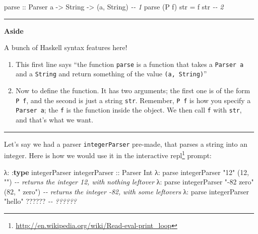 \documentclass[]{article}
\newenvironment{Shaded}{}{}
\newcommand{\CommentTok}[1]{\textcolor[rgb]{0.38,0.63,0.69}{\textit{#1}}}
\newcommand{\DataTypeTok}[1]{\textcolor[rgb]{0.56,0.13,0.00}{#1}}
\newcommand{\DecValTok}[1]{\textcolor[rgb]{0.25,0.63,0.44}{#1}}
\newcommand{\KeywordTok}[1]{\textcolor[rgb]{0.00,0.44,0.13}{\textbf{#1}}}
\newcommand{\NormalTok}[1]{#1}
\newcommand{\OperatorTok}[1]{\textcolor[rgb]{0.40,0.40,0.40}{#1}}
\newcommand{\OtherTok}[1]{\textcolor[rgb]{0.00,0.44,0.13}{#1}}
\newcommand{\StringTok}[1]{\textcolor[rgb]{0.25,0.44,0.63}{#1}}
\renewcommand{\href}[2]{#2\footnote{\url{#1}}}
\begin{document}
\begin{Shaded}
\begin{Highlighting}[]
\OtherTok{parse ::} \DataTypeTok{Parser}\NormalTok{ a }\OtherTok{{-}\textgreater{}} \DataTypeTok{String} \OtherTok{{-}\textgreater{}}\NormalTok{ (a, }\DataTypeTok{String}\NormalTok{)              }\CommentTok{{-}{-} 1}
\NormalTok{parse (}\DataTypeTok{P}\NormalTok{ f) str }\OtherTok{=}\NormalTok{ f str                                 }\CommentTok{{-}{-} 2}
\end{Highlighting}
\end{Shaded}

\begin{center}\rule{0.5\linewidth}{0.5pt}\end{center}

\textbf{Aside}

A bunch of Haskell syntax features here!

\begin{enumerate}
\def\labelenumi{\arabic{enumi}.}
\item
  This first line says ``the function \texttt{parse} is a function that takes a
  \texttt{Parser\ a} and a \texttt{String} and return something of the value
  \texttt{(a,\ String)}''
\item
  Now to define the function. It has two arguments; the first one is of the form
  \texttt{P\ f}, and the second is just a string \texttt{str}. Remember,
  \texttt{P\ f} is how you specify a \texttt{Parser\ a}; the \texttt{f} is the
  function inside the object. We then call \texttt{f} with \texttt{str}, and
  that's what we want.
\end{enumerate}

\begin{center}\rule{0.5\linewidth}{0.5pt}\end{center}

Let's say we had a parser \texttt{integerParser} pre-made, that parses a string
into an integer. Here is how we would use it in the interactive
\href{http://en.wikipedia.org/wiki/Read-eval-print_loop}{repl} prompt:

\begin{Shaded}
\begin{Highlighting}[]
\NormalTok{λ}\OperatorTok{:} \OperatorTok{:}\KeywordTok{type}\NormalTok{ integerParser}
\OtherTok{integerParser ::} \DataTypeTok{Parser} \DataTypeTok{Int}
\NormalTok{λ}\OperatorTok{:}\NormalTok{ parse integerParser }\StringTok{"12"}
\NormalTok{(}\DecValTok{12}\NormalTok{, }\StringTok{""}\NormalTok{)                    }\CommentTok{{-}{-} returns the integer 12, with nothing leftover}
\NormalTok{λ}\OperatorTok{:}\NormalTok{ parse integerParser }\StringTok{"{-}82 zero"}
\NormalTok{(}\DecValTok{82}\NormalTok{, }\StringTok{" zero"}\NormalTok{)               }\CommentTok{{-}{-} returns the integer {-}82, with some leftovers}
\NormalTok{λ}\OperatorTok{:}\NormalTok{ parse integerParser }\StringTok{"hello"}
\OperatorTok{??????}                      \CommentTok{{-}{-} ??????}
\end{Highlighting}
\end{Shaded}
\end{document}

